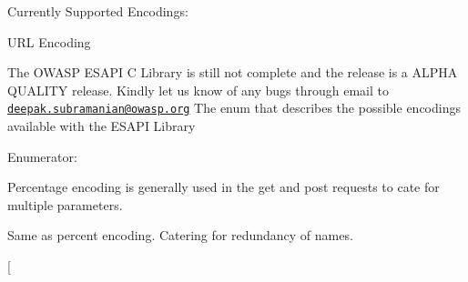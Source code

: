 Currently Supported Encodings: 
\begin{DoxyEnumerate}
\item URL Encoding 
\item 
\begin{DoxyEnumerate}
\end{DoxyEnumerate}\par


The OWASP ESAPI C Library is still not complete and the release is a ALPHA QUALITY release. Kindly let us know of any bugs through email to \href{mailto:deepak.subramanian@owasp.org}{\tt deepak.subramanian@owasp.org} The enum that describes the possible encodings available with the ESAPI Library 
\end{DoxyEnumerate}\begin{Desc}
\item[Enumerator: ]\par
\begin{description}
\item[{\em 
\hypertarget{a00009_af4b9f1c8f83fc1f697a6c6fb2ba5749ca6b143b8248f2d6b9dc93b178c5a2df66}{
ESAPIEncodingTypePercentEncoding}
\label{da/da0/a00009_af4b9f1c8f83fc1f697a6c6fb2ba5749ca6b143b8248f2d6b9dc93b178c5a2df66}
}]Percentage encoding is generally used in the get and post requests to cate for multiple parameters. \item[{\em 
\hypertarget{a00009_af4b9f1c8f83fc1f697a6c6fb2ba5749ca061d2b58fed020025c2b059ed1d90759}{
ESAPIEncodingTypeURLEncoding}
\label{da/da0/a00009_af4b9f1c8f83fc1f697a6c6fb2ba5749ca061d2b58fed020025c2b059ed1d90759}
}]Same as percent encoding. Catering for redundancy of names. \item[{\em 
}
\end{description}
\end{Desc}
